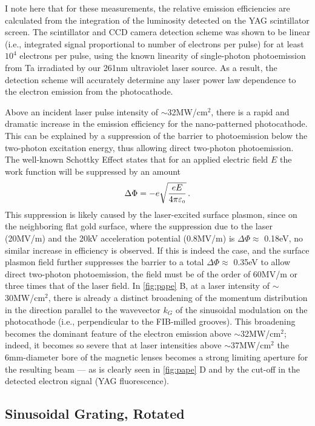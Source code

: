 I note here that for these measurements, the relative emission efficiencies are calculated from the integration of the luminosity detected on the YAG scintillator screen.
The scintillator and CCD camera detection scheme was shown to be linear (i.e., integrated signal proportional to number of electrons per pulse) for at least $10^4$ electrons per pulse, using the known linearity of single-photon photoemission from Ta irradiated by our 261nm ultraviolet laser source.
As a result, the detection scheme will accurately determine any laser power law dependence to the electron emission from the photocathode.

Above an incident laser pulse intensity of $\sim$32MW/cm$^2$, there is a rapid and dramatic increase in the emission efficiency for the nano-patterned photocathode.
This can be explained by a suppression of the barrier to photoemission below the two-photon excitation energy, thus allowing direct two-photon photoemission.
The well-known Schottky Effect states that for an applied electric field $E$ the work function will be suppressed by an amount
\begin{equation}
  \Delta \Phi = - e\sqrt{\frac{e E}{4 \pi \varepsilon_{{\scriptscriptstyle 0}}}} \,\text{.}
\end{equation}
This suppression is likely caused by the laser-excited surface plasmon, since on the neighboring flat gold surface, where the suppression due to the laser (20MV/m) and the 20kV acceleration potential (0.8MV/m) is $\Delta \Phi \approx $ 0.18eV, no similar increase in efficiency is observed.
If this is indeed the case, and the surface plasmon field further suppresses the barrier to a total $ \Delta \Phi \approx $ 0.35eV to allow direct two-photon photoemission, the field must be of the order of 60MV/m or three times that of the laser field.
In \ref{fig:pape} B, at a laser intensity of $\sim$30MW/cm$^2$, there is already a distinct broadening of the momentum distribution in the direction parallel to the wavevector $k_G$ of the sinusoidal modulation on the photocathode (i.e., perpendicular to the FIB-milled grooves). 
This broadening becomes the dominant feature of the electron emission above $\sim$32MW/cm$^2$; indeed, it becomes so severe that at laser intensities above $\sim$37MW/cm$^2$ the 6mm-diameter bore of the magnetic lenses becomes a strong limiting aperture for the resulting beam --- as is clearly seen in \ref{fig:pape} D and by the cut-off in the detected electron signal (YAG fluorescence).

\subsection{Sinusoidal Grating, Rotated}

